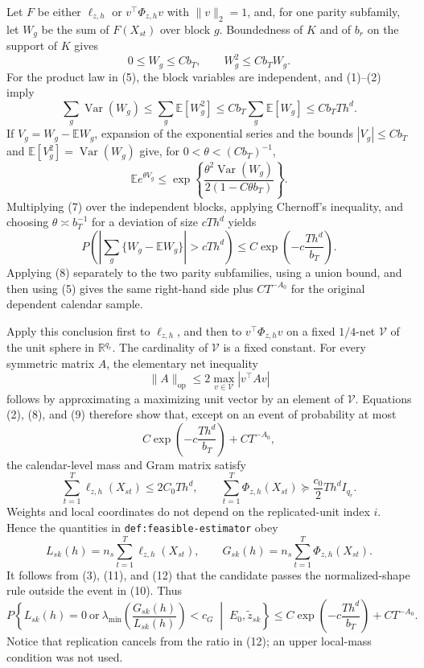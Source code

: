 Let \(F\) be either \(\ell_{z,h}\) or \(v^{\top}\Phi_{z,h}v\) with \(\|v\|_2=1\), and, for one parity subfamily, let \(W_g\) be the sum of \(F(X_{st})\) over block \(g\).  Boundedness of \(K\) and of \(b_r\) on the support of \(K\) gives
\[
 0\le W_g\le Cb_T,
 \qquad
 W_g^2\le Cb_TW_g.
\]
For the product law in (5), the block variables are independent, and (1)--(2) imply
\[
 \sum_g\operatorname{Var}(W_g)
 \le \sum_g\mathbb E[W_g^2]
 \le Cb_T\sum_g\mathbb E[W_g]
 \le Cb_TTh^d.
\tag{6}
\]
If \(V_g=W_g-\mathbb EW_g\), expansion of the exponential series and the bounds \(|V_g|\le Cb_T\) and \(\mathbb E[V_g^2]=\operatorname{Var}(W_g)\) give, for \(0<\theta<(Cb_T)^{-1}\),
\[
 \mathbb E e^{\theta V_g}
 \le
 \exp\!\left\{
   \frac{\theta^2\operatorname{Var}(W_g)}
        {2(1-C\theta b_T)}
 \right\}.
\tag{7}
\]
Multiplying (7) over the independent blocks, applying Chernoff's inequality, and choosing \(\theta\asymp b_T^{-1}\) for a deviation of size \(cTh^d\) yields
\[
 P\!\left(
  \left|\sum_g\{W_g-\mathbb EW_g\}\right|>cTh^d
 \right)
 \le C\exp\!\left(-c\frac{Th^d}{b_T}\right).
\tag{8}
\]
Applying (8) separately to the two parity subfamilies, using a union bound, and then using (5) gives the same right-hand side plus \(CT^{-A_0}\) for the original dependent calendar sample.

Apply this conclusion first to \(\ell_{z,h}\), and then to \(v^{\top}\Phi_{z,h}v\) on a fixed \(1/4\)-net \(\mathcal V\) of the unit sphere in \(\mathbb R^{q_r}\).  The cardinality of \(\mathcal V\) is a fixed constant.  For every symmetric matrix \(A\), the elementary net inequality
\[
 \|A\|_{\mathrm{op}}
 \le 2\max_{v\in\mathcal V}|v^{\top}Av|
\tag{9}
\]
follows by approximating a maximizing unit vector by an element of \(\mathcal V\).  Equations (2), (8), and (9) therefore show that, except on an event of probability at most
\[
 C\exp\!\left(-c\frac{Th^d}{b_T}\right)+CT^{-A_0},
\tag{10}
\]
the calendar-level mass and Gram matrix satisfy
\[
 \sum_{t=1}^T\ell_{z,h}(X_{st})\le2C_0Th^d,
 \qquad
 \sum_{t=1}^T\Phi_{z,h}(X_{st})\succeq\frac{c_0}{2}Th^d I_{q_r}.
\tag{11}
\]
Weights and local coordinates do not depend on the replicated-unit index \(i\).  Hence the quantities in \texttt{def:feasible-estimator} obey
\[
 L_{sk}(h)=n_s\sum_{t=1}^T\ell_{z,h}(X_{st}),
 \qquad
 G_{sk}(h)=n_s\sum_{t=1}^T\Phi_{z,h}(X_{st}).
\tag{12}
\]
It follows from (3), (11), and (12) that the candidate passes the normalized-shape rule outside the event in (10).  Thus
\[
 P\!\left\{
 L_{sk}(h)=0\ \text{or}\
 \lambda_{\min}\!\left(\frac{G_{sk}(h)}{L_{sk}(h)}\right)<c_G
 \;\middle|\;E_0,\widetilde z_{sk}
 \right\}
 \le C\exp\!\left(-c\frac{Th^d}{b_T}\right)+CT^{-A_0}.
\tag{13}
\]
Notice that replication cancels from the ratio in (12); an upper local-mass condition was not used.

